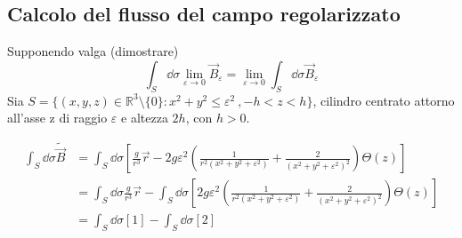 
\subsection{Calcolo del flusso del campo regolarizzato}
\label{sec:flusso_regolarizzato}
Supponendo valga (dimostrare)
$$
  \int_S \dd \sigma \lim_{\varepsilon \to 0} \vec B_\varepsilon = \lim_{\varepsilon \to 0} \int_S \dd \sigma \vec B_\varepsilon
$$
Sia $S = \{(x,y,z) \in \mathbb{R}^3 \setminus \{0\} : x^2 + y^2 \leq \varepsilon ^2\ ,-h<z<h\}$,
cilindro centrato attorno all'asse z di raggio $\varepsilon$ e altezza $2h$, con $h>0$.

\begin{equation*}
   \begin{split}
      \int_S \dd \sigma \tilde{\vec B}  &= \int_S \dd \sigma \left[\frac{g}{r^3}\vec r
         - 2g\varepsilon^2 \left( \frac{1}{r^2(x^2 + y^2 + \varepsilon^2)}
               + \frac{2}{(x^2 + y^2 + \varepsilon^2)^2}\right) \Theta(z)  \right] \\
         &= \int_S \dd \sigma \frac{g}{r^3}\vec r
            - \int_S \dd \sigma \left[ 2g\varepsilon^2 \left( \frac{1}{r^2(x^2 + y^2 + \varepsilon^2)}
                  + \frac{2}{(x^2 + y^2 + \varepsilon^2)^2}\right) \Theta(z) \right] \\
          &= \int_S \dd \sigma [1] - \int_S \dd \sigma [2]
   \end{split}
\end{equation*}


